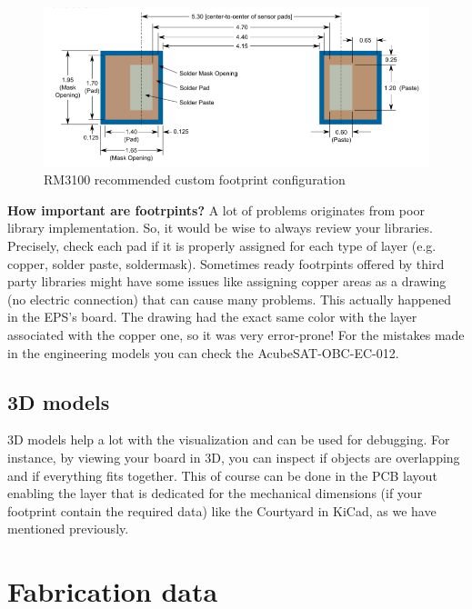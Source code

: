 \documentclass[12pt]{article}
\begin{document}
\begin{figure}
	\centering
	\includegraphics[keepaspectratio, width = \textwidth]{assets/rm3100_foot.png}
	\caption{RM3100 recommended custom footprint configuration}
\end{figure}



\textbf{How important are footrpints?}
A lot of problems originates from poor library implementation. So, it would be wise to always review your libraries. Precisely, check each pad if it is properly assigned for each type of layer (e.g. copper, solder paste, soldermask). Sometimes ready footrpints offered by third party libraries might have some issues like assigning copper areas as a drawing (no electric connection) that can cause many problems. This actually happened in the EPS's board. The drawing had the exact same color with the layer associated with the copper one, so it was very error-prone! For the mistakes made in the engineering models you can check the AcubeSAT-OBC-EC-012.


\subsection{3D models}

3D models help a lot with the visualization and can be used for debugging. For instance, by viewing your board in 3D, you can inspect if objects are overlapping and if everything fits together. This of course can be done in the PCB layout enabling the layer that is dedicated for the mechanical dimensions (if your footprint contain the required data) like the Courtyard in KiCad, as we have mentioned previously.

\section{Fabrication data}
\end{document}
